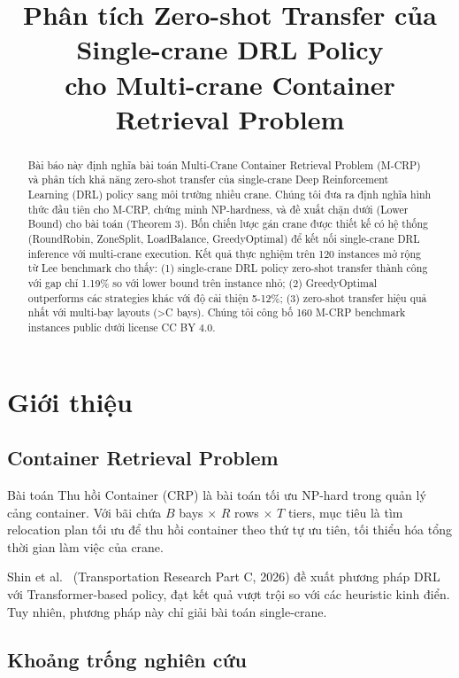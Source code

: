 \documentclass[11pt,a4paper]{article}
\title{\textbf{Phân tích Zero-shot Transfer của Single-crane DRL Policy \\[4pt] cho Multi-crane Container Retrieval Problem}}
\author{}
\date{}
\theoremstyle{definition}
\newcommand{\1}{\mathbbm{1}}
\begin{document}
\maketitle

\begin{abstract}
Bài báo này định nghĩa bài toán Multi-Crane Container Retrieval Problem (M-CRP) và phân tích khả năng zero-shot transfer của single-crane Deep Reinforcement Learning (DRL) policy sang môi trường nhiều crane. Chúng tôi đưa ra định nghĩa hình thức đầu tiên cho M-CRP, chứng minh NP-hardness, và đề xuất chặn dưới (Lower Bound) cho bài toán (Theorem 3). Bốn chiến lược gán crane được thiết kế có hệ thống (RoundRobin, ZoneSplit, LoadBalance, GreedyOptimal) để kết nối single-crane DRL inference với multi-crane execution. Kết quả thực nghiệm trên 120 instances mở rộng từ Lee benchmark cho thấy: (1) single-crane DRL policy zero-shot transfer thành công với gap chỉ 1.19\% so với lower bound trên instance nhỏ; (2) GreedyOptimal outperforms các strategies khác với độ cải thiện 5-12\%; (3) zero-shot transfer hiệu quả nhất với multi-bay layouts (\textgreater C bays). Chúng tôi công bố 160 M-CRP benchmark instances public dưới license CC BY 4.0.
\end{abstract}

\section{Giới thiệu}

\subsection{Container Retrieval Problem}

Bài toán Thu hồi Container (CRP) là bài toán tối ưu NP-hard trong quản lý cảng container. Với bãi chứa $B$ bays $\times$ $R$ rows $\times$ $T$ tiers, mục tiêu là tìm relocation plan tối ưu để thu hồi container theo thứ tự ưu tiên, tối thiểu hóa tổng thời gian làm việc của crane.

Shin et al.~\cite{shin2026} (Transportation Research Part C, 2026) đề xuất phương pháp DRL với Transformer-based policy, đạt kết quả vượt trội so với các heuristic kinh điển. Tuy nhiên, phương pháp này chỉ giải bài toán single-crane.

\subsection{Khoảng trống nghiên cứu}
\end{document}
